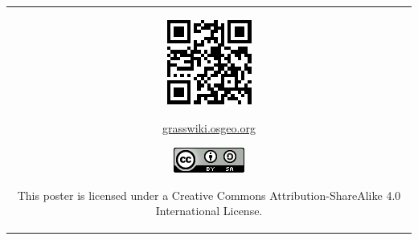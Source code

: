\documentclass[25pt, margin=0mm, innermargin=15mm, blockverticalspace=15mm, colspace=15mm, subcolspace=8mm]{tikzposter}
\begin{document}
\begin{columns}
{\begin{center}
\begin{tabular}{c}
\begin{minipage}{\qrcodesize}
\includegraphics[width=\textwidth]{./images/grass_qr.pdf}
\end{minipage}

\begin{minipage}{0.2\linewidth}
\small {\url{grasswiki.osgeo.org}}
\end{minipage}

\begin{minipage}{0.1\linewidth}
\href{http://creativecommons.org/licenses/by-sa/4.0/}{\includegraphics[width=\textwidth]{ccbysa}}
\end{minipage}

\begin{minipage}{0.35\linewidth}
\small This poster is licensed under a Creative Commons Attribution-ShareAlike 4.0 International License.
\end{minipage}

\end{tabular}
\end{center}

}

\end{columns}
\end{document}
